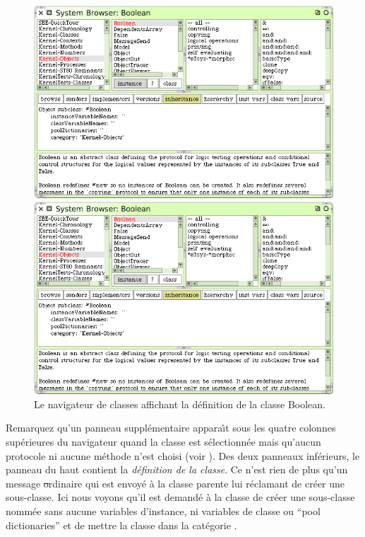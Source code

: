 \documentclass[a4paper,10pt,twoside]{book}
\begin{document}

\begin{figure}[hbt]
\ifluluelse
	{\centerline {\includegraphics[width=\textwidth]{Kernel-objects-boolean}}}
	{\centerline {\includegraphics[scale=0.7]{Kernel-objects-boolean}}}
\caption{Le navigateur de classes affichant la d\'efinition de la
  classe Boolean.\label{fig:browseBoolean}}
\end{figure}

Remarquez qu'un panneau suppl\'ementaire appara\^{\i}t sous les quatre
colonnes sup\'erieures du navigateur quand la classe  est
s\'electionn\'ee mais qu'aucun protocole ni aucune m\'ethode n'est choisi
(voir ).
Des deux panneaux inf\'erieurs, le panneau du haut contient la 
\emph{d\'efinition de la classe}.
Ce n'est rien de plus qu'un message \st ordinaire qui est envoy\'e \`a
la classe parente lui r\'eclamant de cr\'eer une sous-classe.
Ici nous voyons qu'il est demand\'e \`a la classe  de
cr\'eer une sous-classe nomm\'ee  sans aucune variables
d'instance, ni variables de classe ou ``pool dictionaries'' et de 
mettre la classe  dans la cat\'egorie .
\end{document}
